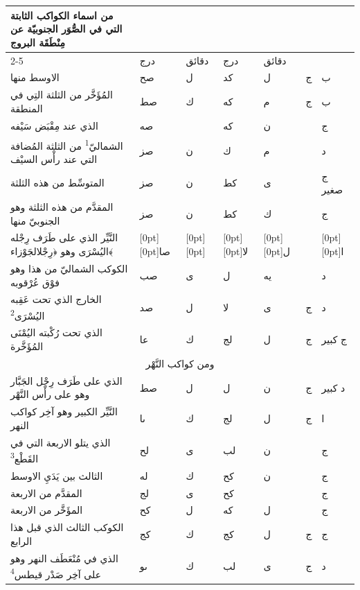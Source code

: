 \documentclass[11pt]{article}
\newcommand{\AbjadZero}{{\NallinoSigns\symbol{"E000}}}
\begin{document}
\begin{Arabic}\begin{tabular}{|p{84mm}|>{\centering\arraybackslash}p{9mm}|>{\centering\arraybackslash}p{9mm}|>{\centering\arraybackslash}p{9mm}|>{\centering\arraybackslash}p{9mm}|>{\centering\arraybackslash}p{14mm}|>{\centering\arraybackslash}p{17mm}|}\hline
\multirow{2}{*}{\parbox{80mm}{\centering من اسماء الكواكب الثابتة التي في الصُّوَر الجنوبيّة عن مِنْطَقَة البروج}} & \multicolumn{2}{c|}{الطول} & \multicolumn{2}{c|}{العرض} & \multirow{2}{*}{\parbox{13mm}{\centering\small علامات الجهة}} & \multirow{2}{*}{\parbox{16mm}{\centering\small مراتب العظمة}} \\ \cline{2-5}
 & {\small درج} & {\small دقائق} & {\small درج} & {\small دقائق} & & \\ \hline
الاوسط منها & صح & ل & كد & ل & ج & ب \\
المُؤَخَّر من الثلثة التِي في المنطقة & صط & ك & كه & م & ج & ب \\
الذي عند مِقْبَض سَيْفه & صه & \AbjadZero{} & كه & ن &  & ج \\
الشماليّ\textsuperscript{1} من الثلثة المُضافة التي عند رأْس السيْف & صز & ن & ك & م &  & د \\
المتوسِّط من هذه الثلثة & صز & ن & كط & ى &  & ج صغير \\
المقدَّم من هذه الثلثة وهو الجنوبيّ منها & صز & ن & كط & ك &  & ج \\
النَّيِّر الذي على طَرَف رِجْله اليُسْرَى وهو ﴿رِجْل\newline الجَوْزاء﴾ & \raisebox{-1\normalbaselineskip}[0pt][0pt]{صا} & \raisebox{-1\normalbaselineskip}[0pt][0pt]{\AbjadZero{}} & \raisebox{-1\normalbaselineskip}[0pt][0pt]{لا} & \raisebox{-1\normalbaselineskip}[0pt][0pt]{ل} &  & \raisebox{-1\normalbaselineskip}[0pt][0pt]{ا} \\
الكوكب الشماليّ من هذا وهو فوْق عُرْقوبه & صب & ى & ل & يه &  & د \\
الخارج الذي تحت عَقِبه اليُسْرَى\textsuperscript{2} & صد & ل & لا & ى & ج & د \\
الذي تحت رُكْبته اليُمْنَى المُؤَخَّرة & عا & ك & لج & ل & ج & ج كبير \\
\hline
\multicolumn{7}{|c|}{\large ومن كواكب النَّهْر} \\ \hline
الذي على طَرَف رِجْل الجَبَّار وهو على رأْس النَّهْر & صط & ل & ل & ن & ج & د كبير \\
النَّيِّر الكبير وهو آخِر كواكب النهر & ىا & ك & لج & ل & ج & ا \\
الذي يتلو الاربعة التي في القَطْع\textsuperscript{3} & لح & ى & لب & ن &  & ج \\
الثالث بين يَدَيِ الاوسط & له & ك & كح & ن &  & ج \\
المقدَّم من الاربعة & لج & ى & كح & \AbjadZero{} &  & ج \\
المؤَخَّر من الاربعة & كح & ل & كه & ل &  & ج \\
الكوكب الثالث الذي قبل هذا الرابع & كج & ك & كج & ل & ج & ج \\
الذي في مُنْعَطَف النهر وهو على آخِر صَدْر قيطس\textsuperscript{4} & ىو & ك & لب & ى & ج & د \\
\hline
\end{tabular}\end{Arabic}
\end{document}
